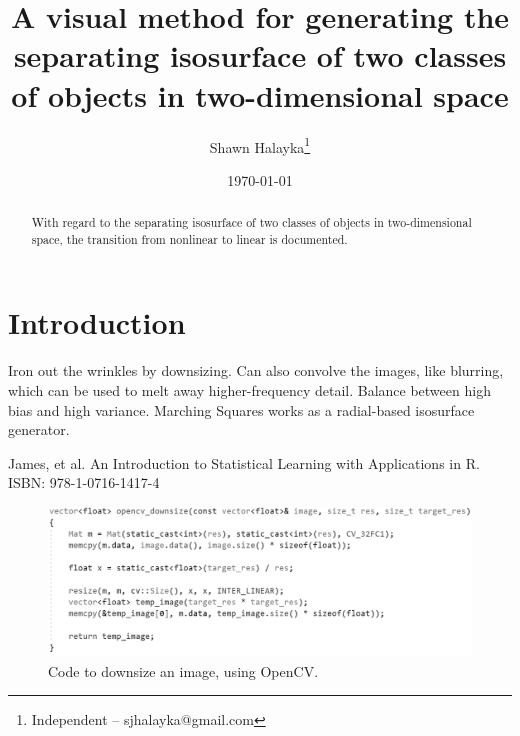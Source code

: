 \documentclass[12pt]{article}
\title{A visual method for generating the separating isosurface of two classes of objects in two-dimensional space}
\author{
Shawn Halayka\footnote{Independent -- sjhalayka@gmail.com}
}
\date{\today\;\currenttime}
\begin{document}
\maketitle

\begin{abstract}
With regard to the separating isosurface of two classes of objects in two-dimensional space, the transition from nonlinear to linear is documented.
\end{abstract}




\section{Introduction}

Iron out the wrinkles by downsizing.
Can also convolve the images, like blurring, which can be used to melt away higher-frequency detail.
Balance between high bias and high variance. 
Marching Squares works as a radial-based isosurface generator.





\begin{thebibliography}{9}

 James, et al. An Introduction to Statistical Learning with Applications in R. ISBN: 978-1-0716-1417-4

\end{thebibliography}






\begin{figure} 
\centering
  \includegraphics[width = 4 in]{downsize_code.png}
  \caption{Code to downsize an image, using OpenCV.
}
\end{figure}
\end{document}
